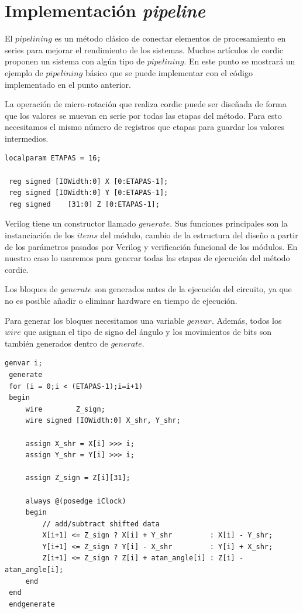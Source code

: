\section{Implementación \textit{pipeline}}
El $pipelining$ es un método clásico de conectar elementos de procesamiento en series para  mejorar el rendimiento de los sistemas. Muchos artículos de \gls{cordic} proponen un sistema con algún tipo de $pipelining$. En este punto se mostrará un ejemplo de $pipelining$ básico que se puede implementar con el código implementado en el punto anterior.

La operación de micro-rotación que realiza \gls{cordic} puede ser diseñada de forma que los valores se muevan en serie por todas las etapas del método. Para esto necesitamos el mismo número de registros que etapas para guardar los valores intermedios.

\begin{lstlisting}[caption={Registros de \gls{cordic} ampliados para \textit{pipelining}}]
localparam ETAPAS = 16;

 reg signed [IOWidth:0] X [0:ETAPAS-1];
 reg signed [IOWidth:0] Y [0:ETAPAS-1];
 reg signed    [31:0] Z [0:ETAPAS-1];

\end{lstlisting}

Verilog tiene un constructor llamado $generate$. Sus funciones principales son la instanciación de los $items$ del módulo, cambio de la estructura del diseño a partir de los parámetros pasados por Verilog y verificación funcional de los módulos. En nuestro caso lo usaremos para generar todas las etapas de ejecución del método \gls{cordic}.

Los bloques de $generate$ son generados antes de la ejecución del circuito, ya que no es posible añadir o eliminar hardware en tiempo de ejecución.

Para generar los bloques necesitamos una variable $genvar$. Además, todos los $wire$ que asignan el tipo de signo del ángulo y los movimientos de bits son también generados dentro de $generate$.

\begin{lstlisting}[caption={Ejecución principal de \gls{cordic} con \textit{pipelining}}]
 genvar i;
 generate
 for (i = 0;i < (ETAPAS-1);i=i+1) 
 begin
     wire        Z_sign;
     wire signed [IOWidth:0] X_shr, Y_shr;

     assign X_shr = X[i] >>> i; 
     assign Y_shr = Y[i] >>> i;

     assign Z_sign = Z[i][31];
         
     always @(posedge iClock)
     begin
         // add/subtract shifted data
         X[i+1] <= Z_sign ? X[i] + Y_shr         : X[i] - Y_shr;
         Y[i+1] <= Z_sign ? Y[i] - X_shr         : Y[i] + X_shr;
         Z[i+1] <= Z_sign ? Z[i] + atan_angle[i] : Z[i] - atan_angle[i];
     end 
 end     
 endgenerate
\end{lstlisting}

